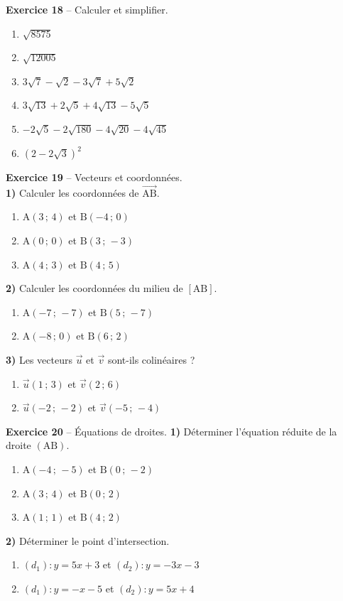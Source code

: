 \documentclass[12pt,a4paper,french]{article}
\begin{document}
\noindent\textbf{Exercice 18} -- Calculer et simplifier.
\begin{enumerate}
\item $\sqrt{8575}$
\item $\sqrt{12005}$
\item $3\sqrt{7} - \sqrt{2} - 3\sqrt{7} + 5\sqrt{2}$
\item $3\sqrt{13} + 2\sqrt{5} + 4\sqrt{13} - 5\sqrt{5}$
\item $-2\sqrt{5} - 2\sqrt{180} - 4\sqrt{20} - 4\sqrt{45}$
\item $(2 - 2\sqrt{3})^2$
\end{enumerate}
\bigskip

\noindent\textbf{Exercice 19} -- Vecteurs et coordonnées.\\
\medskip
\noindent\textbf{1)} Calculer les coordonnées de $\overrightarrow{\ensuremath{\mathrm{A}}\ensuremath{\mathrm{B}}}$.
\begin{enumerate}
\item $\ensuremath{\mathrm{A}}(3\,;\,4)$ et $\ensuremath{\mathrm{B}}(-4\,;\,0)$
\item $\ensuremath{\mathrm{A}}(0\,;\,0)$ et $\ensuremath{\mathrm{B}}(3\,;\,-3)$
\item $\ensuremath{\mathrm{A}}(4\,;\,3)$ et $\ensuremath{\mathrm{B}}(4\,;\,5)$
\end{enumerate}
\medskip
\noindent\textbf{2)} Calculer les coordonnées du milieu de $[\ensuremath{\mathrm{A}}\ensuremath{\mathrm{B}}]$.
\begin{enumerate}
\item $\ensuremath{\mathrm{A}}(-7\,;\,-7)$ et $\ensuremath{\mathrm{B}}(5\,;\,-7)$
\item $\ensuremath{\mathrm{A}}(-8\,;\,0)$ et $\ensuremath{\mathrm{B}}(6\,;\,2)$
\end{enumerate}
\medskip
\noindent\textbf{3)} Les vecteurs $\vec{u}$ et $\vec{v}$ sont-ils colinéaires ?
\begin{enumerate}
\item $\vec{u}(1\,;\,3)$ et $\vec{v}(2\,;\,6)$
\item $\vec{u}(-2\,;\,-2)$ et $\vec{v}(-5\,;\,-4)$
\end{enumerate}
\bigskip

\noindent\textbf{Exercice 20} -- Équations de droites.
\medskip
\noindent\textbf{1)} Déterminer l'équation réduite de la droite $(\ensuremath{\mathrm{A}}\ensuremath{\mathrm{B}})$.
\begin{enumerate}
\item $\ensuremath{\mathrm{A}}(-4\,;\,-5)$ et $\ensuremath{\mathrm{B}}(0\,;\,-2)$
\item $\ensuremath{\mathrm{A}}(3\,;\,4)$ et $\ensuremath{\mathrm{B}}(0\,;\,2)$
\item $\ensuremath{\mathrm{A}}(1\,;\,1)$ et $\ensuremath{\mathrm{B}}(4\,;\,2)$
\end{enumerate}
\noindent\textbf{2)} Déterminer le point d'intersection.
\begin{enumerate}
\item $(d_1): y = 5x + 3$ et $(d_2): y = -3x - 3$
\item $(d_1): y = -x - 5$ et $(d_2): y = 5x + 4$
\end{enumerate}
\bigskip
\end{document}
